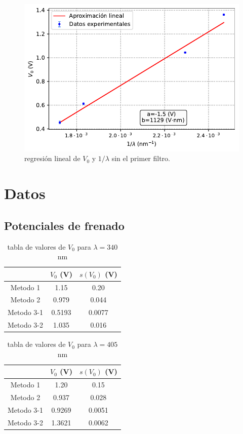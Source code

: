 \documentclass[12pt,a4paper]{article}
\numberwithin{equation}{section}
\numberwithin{table}{section}
\numberwithin{figure}{section}
\begin{document}
\begin{figure}[h!]  \centering
\includegraphics[scale=0.97]{Metodo_3-Nuevo-sin.pdf}
\caption{regresión lineal de $V_0$ y $1/\lambda$ sin el primer filtro.}
\label{Fig:6.5.4}
\end{figure}



\newpage


\section{Datos}  \label{Sec:7-tablas}

\subsection{Potenciales de frenado} \label{Subsec:7.1}


\begin{table}[h!] \centering 
\begin{tabular}{c|c|c} 
 & $V_0$ (V) & $s(V_0)$ (V) \\ \hline 
Metodo 1 & 1.15 &  0.20 \\ 
Metodo 2 & 0.979 &  0.044 \\ 
Metodo 3-1 & 0.5193 &  0.0077 \\ 
Metodo 3-2 & 1.035 &  0.016 \\ \hline
\end{tabular}
\caption{tabla de valores de $V_0$ para $\lambda=340$ nm} 
\label{Tab:7.2.1} 
\end{table} 


\begin{table}[h!] \centering 
\begin{tabular}{c|c|c} 
 & $V_0$ (V) & $s(V_0)$ (V) \\ \hline 
Metodo 1 & 1.20 &  0.15 \\ 
Metodo 2 & 0.937 &  0.028 \\ 
Metodo 3-1 & 0.9269 &  0.0051 \\ 
Metodo 3-2 & 1.3621 &  0.0062 \\ \hline
\end{tabular}
\caption{tabla de valores de $V_0$ para $\lambda=405$ nm} 
\label{Tab:7.2.2} 
\end{table} 
\end{document}
